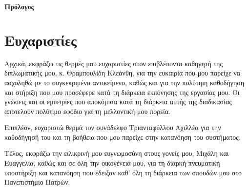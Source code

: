 \begin{center}
  {\LARGE \textbf{Πρόλογος}}\\[1cm]
  \section*{Ευχαριστίες}\label{sec:thankyounotes}
\end{center}

Αρχικά, εκφράζω τις θερμές μου ευχαριστίες στον επιβλέποντα καθηγητή της διπλωματικής μου, κ. Θραμπουλίδη Κλεάνθη, για την ευκαιρία που μου παρείχε να ασχοληθώ με το συγκεκριμένο αντικείμενο, καθώς και για την πολύτιμη καθοδήγηση και στήριξη που μου προσέφερε κατά τη διάρκεια εκπόνησης της εργασίας μου. Οι γνώσεις και οι εμπειρίες που αποκόμισα κατά τη διάρκεια αυτής της διαδικασίας αποτελούν πολύτιμο εφόδιο για τη μελλοντική μου πορεία.

\vspace{5mm}
Επιπλέον, ευχαριστώ θερμά τον συνάδελφο Τριανταφύλλου Αχιλλέα για την καθοδήγησή του και τη βοήθεια που μου παρείχε στην κατανόηση του συστήματος.

\vspace{5mm}
Τέλος, εκφράζω την ειλικρινή μου ευγνωμοσύνη στους γονείς μου, Μιχάλη και Ευαγγελία, καθώς και σε όλη την οικογένειά μου, για τη διαρκή πνευματική υποστήριξη και κατανόηση που έδειξαν καθ' όλη τη διάρκεια των σπουδών μου στο Πανεπιστήμιο Πατρών.
